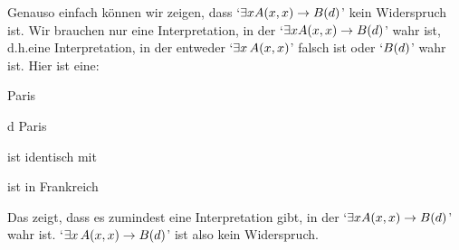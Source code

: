 Genauso einfach können wir zeigen, dass `$\exists x\mathord{A}(x,x) \rightarrow \mathord{B}(d)$' kein Widerspruch ist. Wir brauchen nur eine Interpretation, in der `$\exists x\mathord{A}(x,x) \rightarrow \mathord{B}(d)$' wahr ist, d.h.\@ eine Interpretation, in der entweder `$\exists x\, \mathord{A}(x,x)$' falsch ist oder `$\mathord{B}(d)$' wahr ist. Hier ist eine:
	\begin{ekey}
		\item[\text{Domäne}] Paris
		\item[d] Paris
		\item[\atom{A}{x,y}]  ist identisch mit 
		\item[\atom{B}{x}]  ist in Frankreich
	\end{ekey}
Das zeigt, dass es zumindest eine Interpretation gibt, in der `$\exists x\mathord{A}(x,x) \rightarrow \mathord{B}(d)$' wahr ist. `$\exists x\, \mathord{A}(x,x) \rightarrow \mathord{B}(d)$' ist also kein Widerspruch.

